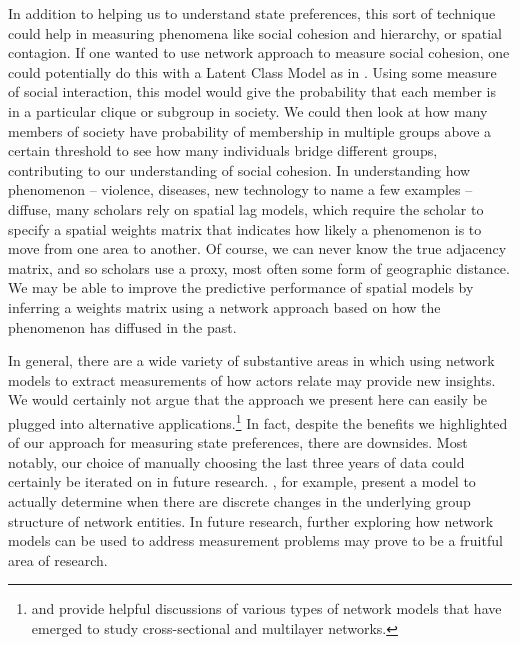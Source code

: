 In addition to helping us to understand state preferences, this sort of technique could help in measuring phenomena like social cohesion and hierarchy, or spatial contagion. If one wanted to use network approach to measure social cohesion, one could potentially do this with a Latent Class Model as in \citet{airoldi:etal:2008}. Using some measure of social interaction, this model would give the probability that each member is in a particular clique or subgroup in society. We could then look at how many members of society have probability of membership in multiple groups above a certain threshold to see how many individuals bridge different groups, contributing to our understanding of social cohesion. In understanding how phenomenon -- violence, diseases, new technology to name a few examples -- diffuse, many scholars rely on spatial lag models, which require the scholar to specify a spatial weights matrix that indicates how likely a phenomenon is to move from one area to another. Of course, we can never know the true adjacency matrix, and so scholars use a proxy, most often some form of geographic distance. We may be able to improve the predictive performance of spatial models by inferring a weights matrix using a network approach based on how the phenomenon has diffused in the past.

In general, there are a wide variety of substantive areas in which using network models to extract measurements of how actors relate may provide new insights. We would certainly not argue that the approach we present here can easily be plugged into alternative applications.\footnote{\citet{goldenberg:etal:2010} and \citet{kim:etal:2018} provide helpful discussions of various types of network models that have emerged to study cross-sectional and multilayer networks.} In fact, despite the benefits we highlighted of our approach for measuring state preferences, there are downsides. Most notably, our choice of manually choosing the last three years of data could certainly be iterated on in future research. \citet{park:sohn:2017}, for example, present a model to actually determine when there are discrete changes in the underlying group structure of network entities. In future research, further exploring how network models can be used to address measurement problems may prove to be a fruitful area of research.

